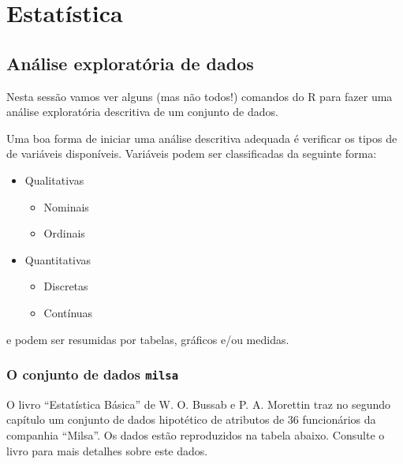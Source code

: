 \documentclass[10pt,a4paper]{book}
\providecommand{\tightlist}{%
  \setlength{\itemsep}{0pt}\setlength{\parskip}{0pt}}
\begin{document}
\part{Estatística}\label{part-estatistica}

\chapter{Análise exploratória de
dados}\label{analise-exploratoria-de-dados}

Nesta sessão vamos ver alguns (mas não todos!) comandos do R para fazer
uma análise exploratória descritiva de um conjunto de dados.

Uma boa forma de iniciar uma análise descritiva adequada é verificar os
tipos de de variáveis disponíveis. Variáveis podem ser classificadas da
seguinte forma:

\begin{itemize}
\tightlist
\item
  Qualitativas

  \begin{itemize}
  \tightlist
  \item
    Nominais
  \item
    Ordinais
  \end{itemize}
\item
  Quantitativas

  \begin{itemize}
  \tightlist
  \item
    Discretas
  \item
    Contínuas
  \end{itemize}
\end{itemize}

e podem ser resumidas por tabelas, gráficos e/ou medidas.

\section{\texorpdfstring{O conjunto de dados
\texttt{milsa}}{O conjunto de dados milsa}}\label{o-conjunto-de-dados-milsa}

O livro ``Estatística Básica'' de W. O. Bussab e P. A. Morettin traz no
segundo capítulo um conjunto de dados hipotético de atributos de 36
funcionários da companhia ``Milsa''. Os dados estão reproduzidos na
tabela abaixo. Consulte o livro para mais detalhes sobre este dados.
\end{document}
